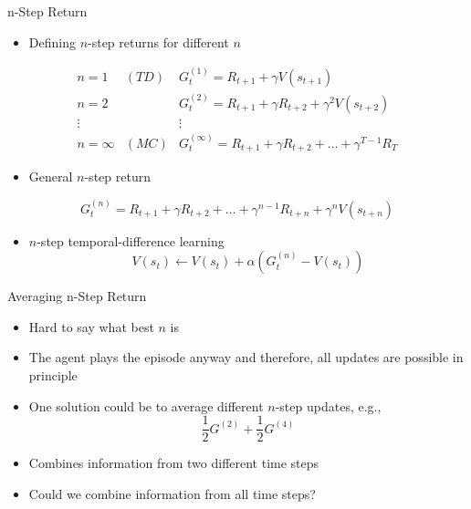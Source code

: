 \begin{frame}[c]{n-Step Return}
	
\begin{itemize}
	\item Defining $n$-step returns for different $n$
\end{itemize}

\begin{eqnarray}
n=1 & (TD) & G_t^{(1)} = R_{t+1} + \gamma V(s_{t+1})\nonumber\\
n=2 &  & G_t^{(2)} = R_{t+1} + \gamma R_{t+2} + \gamma^2 V(s_{t+2})\nonumber\\
\vdots & & \vdots\nonumber\\
n = \infty & (MC) & G_t^{(\infty)} = R_{t+1} + \gamma R_{t+2} + \ldots + \gamma^{T-1} R_T\nonumber
\end{eqnarray}

\begin{itemize}
	\item General $n$-step return
\end{itemize}

$$ G_t^{(n)} =  R_{t+1} + \gamma R_{t+2} + \ldots + \gamma^{n-1} R_{t+n} + \gamma^n V(s_{t+n})$$
	
\begin{itemize}
	\item $n$-step temporal-difference learning
	$$V(s_t) \gets V(s_t) + \alpha \left(G_t^{(n)} - V(s_t)\right) $$
\end{itemize}
	
\end{frame}
\begin{frame}[c]{Averaging n-Step Return}
	
	\begin{itemize}
		\item Hard to say what best $n$ is
		\item The agent plays the episode anyway and therefore, all updates are possible in principle
		\item One solution could be to average different $n$-step updates, e.g.,
		$$ \frac{1}{2}G^{(2)} + \frac{1}{2}G^{(4)}$$
		\item Combines information from two different time steps
		\item Could we combine information from all time steps?
	\end{itemize}
	
\end{frame}
